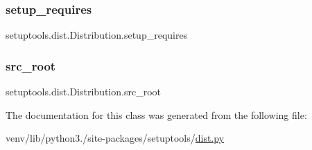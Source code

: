 \subsubsection{\texorpdfstring{setup\+\_\+requires}{setup\_requires}}
{\footnotesize\ttfamily setuptools.\+dist.\+Distribution.\+setup\+\_\+requires}

\mbox{\label{classsetuptools_1_1dist_1_1Distribution_a95bf259f63af6e93f852a55ec8350442}} 
\subsubsection{\texorpdfstring{src\+\_\+root}{src\_root}}
{\footnotesize\ttfamily setuptools.\+dist.\+Distribution.\+src\+\_\+root}



The documentation for this class was generated from the following file\+:\begin{DoxyCompactItemize}
\item 
venv/lib/python3./site-\/packages/setuptools/\hyperlink{dist_8py}{dist.\+py}\end{DoxyCompactItemize}

